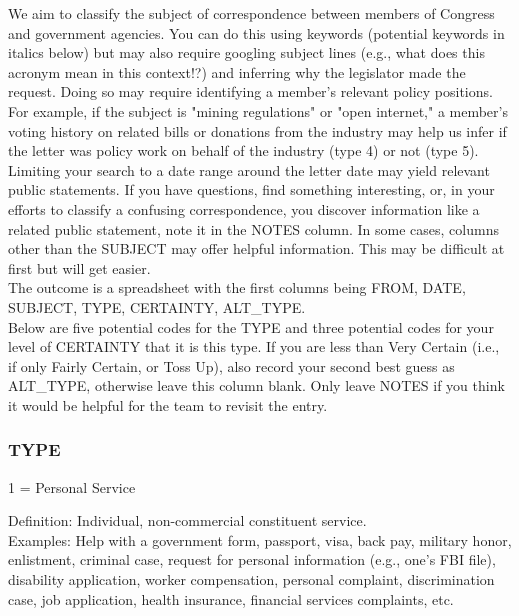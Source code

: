 \documentclass[12pt]{article}
\begin{document}
We aim to classify the subject of correspondence between members of Congress and government agencies. You can do this using keywords (potential keywords in italics below) but may also require googling subject lines (e.g., what does this acronym mean in this context!?) and inferring why the legislator made the request. Doing so may require identifying a member's relevant policy positions. For example, if the subject is "mining regulations" or "open internet," a member's voting history on related bills or donations from the industry may help us infer if the letter was policy work on behalf of the industry (type 4) or not (type 5). Limiting your search to a date range around the letter date may yield relevant public statements. If you have questions, find something interesting, or, in your efforts to classify a confusing correspondence, you discover information like a related public statement, note it in the NOTES column. In some cases, columns other than the SUBJECT may offer helpful information. This may be difficult at first but will get easier. \\

The outcome is a spreadsheet with the first columns being FROM, DATE, SUBJECT, TYPE, CERTAINTY, ALT\_TYPE.\\


Below are five potential codes for the TYPE and three potential codes for your level of CERTAINTY that it is this type. If you are less than Very Certain (i.e., if only Fairly Certain, or Toss Up), also record your second best guess as ALT\_TYPE, otherwise leave this column blank. Only leave NOTES if you think it would be helpful for the team to revisit the entry.

\subsubsection{TYPE}

1 = Personal Service\\

\hfill\begin{minipage}{\dimexpr\textwidth-2cm}
Definition: Individual, non-commercial constituent service.\\
Examples: Help with a government form, passport, visa, back pay, military honor, enlistment, criminal case, request for personal information (e.g., one’s FBI file), disability application, worker compensation, personal complaint, discrimination case, job application, health insurance, financial services complaints, etc.\\
\end{minipage}
\end{document}
